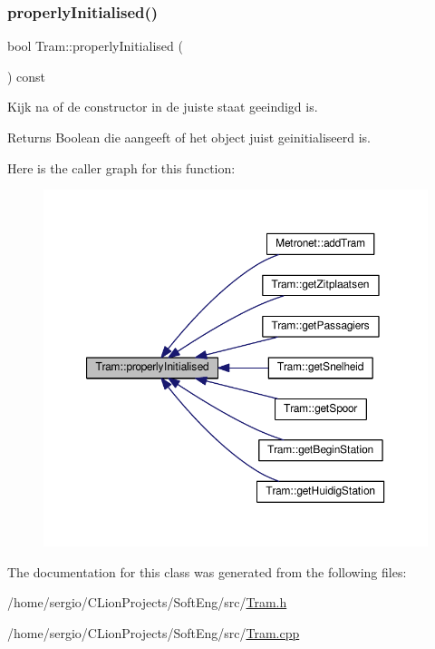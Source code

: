\subsubsection{\texorpdfstring{properly\+Initialised()}{properlyInitialised()}}
{\footnotesize\ttfamily bool Tram\+::properly\+Initialised (\begin{DoxyParamCaption}{ }\end{DoxyParamCaption}) const}



Kijk na of de constructor in de juiste staat geeindigd is. 

\begin{DoxyReturn}{Returns}
Boolean die aangeeft of het object juist geinitialiseerd is. 
\end{DoxyReturn}
Here is the caller graph for this function\+:\nopagebreak
\begin{figure}[H]
\begin{center}
\leavevmode
\includegraphics[width=350pt]{class_tram_ac2688f590e4db232b4f535c9bf959efb_icgraph}
\end{center}
\end{figure}


The documentation for this class was generated from the following files\+:\begin{DoxyCompactItemize}
\item 
/home/sergio/\+C\+Lion\+Projects/\+Soft\+Eng/src/\hyperlink{_tram_8h}{Tram.\+h}\item 
/home/sergio/\+C\+Lion\+Projects/\+Soft\+Eng/src/\hyperlink{_tram_8cpp}{Tram.\+cpp}\end{DoxyCompactItemize}
